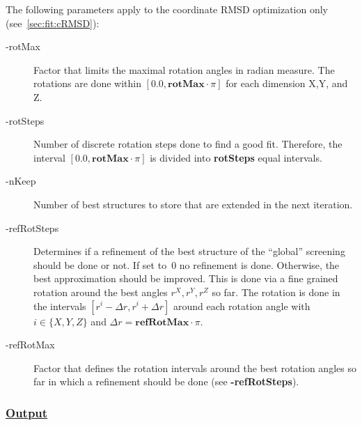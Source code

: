 \documentclass{article}
\begin{document}
The following parameters apply to the coordinate RMSD optimization only
(see~\ref{sec:fit:cRMSD}):

\begin{description}
	\item[-rotMax] Factor that limits the maximal rotation angles in radian
	measure. The rotations are done within $[0.0, \textbf{rotMax}\cdot\pi]$ for
	each dimension X,Y, and Z.
	\item[-rotSteps] Number of discrete rotation steps done to find a good fit.
	Therefore, the interval $[0.0, \textbf{rotMax}\cdot\pi]$ is divided into
	{\bfseries rotSteps} equal intervals.
	\item[-nKeep] Number of best structures to store that are extended in the next
	iteration.
	\item[-refRotSteps] Determines if a refinement of the best structure of the
	``global'' screening should be done or not. If set to~0 no refinement is done.
	Otherwise, the best approximation should be improved. This is done via a
	fine grained rotation around the best angles $r^X, r^Y, r^Z$ so far. The
	rotation is done in the intervals $[r^i-\Delta r, r^i+\Delta r]$ around
	each rotation angle with $i\in\{X,Y,Z\}$ and $\Delta r =
	\textbf{refRotMax}\cdot\pi$.
	\item[-refRotMax] Factor that defines the rotation intervals around the best
	rotation angles so far in which a refinement should be done (see {\bfseries
	-refRotSteps}).
\end{description}


\subsubsection*{\underline{ Output }}
\end{document}
